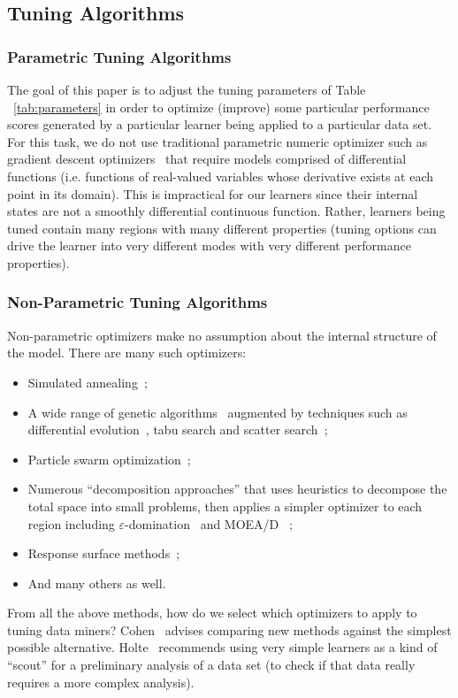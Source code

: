 \documentclass{sig-alternative}
\newcommand{\bi}{\begin{itemize}[leftmargin=0.4cm]}
\newcommand{\ei}{\end{itemize}}
\newcommand{\tab}[1]{Table ~\ref{tab:#1}}
\begin{document}
\subsection{Tuning Algorithms}


 \subsubsection{Parametric Tuning Algorithms}
The  goal of this paper is to adjust the tuning parameters of \tab{parameters}
in order to   optimize (improve) some particular performance scores
generated by a particular learner being applied to  a particular data set.
For this task, we do not use traditional parametric numeric optimizer  
such as  gradient descent optimizers~\cite{saltelli00} that require models comprised of
differential functions (i.e. functions of real-valued variables whose derivative exists at each point in its domain).
This is impractical  for  our learners since their internal states are   not a smoothly differential continuous function.
Rather, learners being tuned  contain many regions with many different properties (tuning options can
drive the learner into very different modes with very different performance properties).


 \subsubsection{Non-Parametric Tuning Algorithms}
 
Non-parametric  optimizers   make no assumption
about the internal structure of the model.
There are many such optimizers:
\bi
\item
Simulated annealing~\cite{fea02a,me07f};
\item
A wide range of genetic algorithms~\cite{goldberg79} augmented by
techniques such as differential evolution~\cite{storn1997differential}, tabu search and scatter search~\cite{Glover1986563,Beausoleil2006426,Molina05sspmo:a,4455350};
\item
Particle swarm optimization~\cite{pan08}; 
\item 
Numerous ``decomposition approaches'' that uses
    heuristics to decompose the total space into   small problems,   then applies a
    simpler optimizer to each region including \mbox{$\varepsilon$-domination}~\cite{deb05} and MOEA/D ~\cite{zhang07};
    \item 
    Response surface methods~\cite{krall15,Zuluaga:13};
    \item
    And many others as well.
    \ei
From all the above methods, how do we select which optimizers to apply to tuning data miners?
Cohen~\cite{cohen95} advises comparing new 
 methods against the simplest possible alternative. 
Holte~\cite{holte93} recommends using very simple  learners
 as a
kind of ``scout'' for a  preliminary analysis of a data
set (to check if that data really requires a more
complex analysis).
\end{document}
